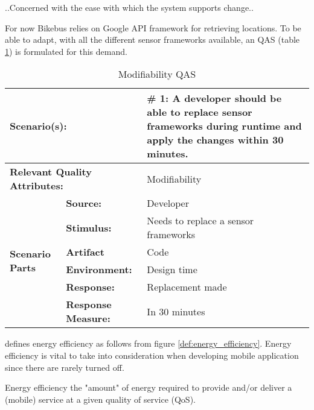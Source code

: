 \begin{defi}
..Concerned with the ease with which the system supports change..  
  \label{def:modifiability}
\end{defi}

 For now Bikebus relies on Google API framework for retrieving locations. To be able to adapt, with all the different sensor frameworks available, an QAS (table \ref{table:modifiability_qas}) is formulated for this demand. 

\begin{table}[H]
\begin{center}
\begin{tabular}{|p{0.3cm}|p{2.5cm}|p{8cm}|}
  \hline
  \multicolumn{2}{|p{3cm}|}{\bfseries Scenario(s):} & \#  1: A developer should be able to replace sensor frameworks during runtime and apply the changes within 30 minutes. \\
  \hline
  \multicolumn{2}{|p{3cm}|}{\bfseries Relevant Quality Attributes:} & Modifiability\\
  \hline
  \multirow{6}{*}{\begin{sideways}{\bfseries Scenario Parts}\end{sideways}}
  & {\bfseries Source:} & Developer \\
  \cline{2-3}
  & {\bfseries Stimulus:} & Needs to replace a sensor frameworks \\
  \cline{2-3}
  & {\bfseries Artifact} &  Code \\
  \cline{2-3}
  & {\bfseries Environment:} &  Design time \\
  \cline{2-3}
  & {\bfseries Response:} &  Replacement made\\
  \cline{2-3}
  & {\bfseries Response Measure:} & In 30 minutes\\
  \hline
\end{tabular}
\caption{Modifiability QAS}
\label{table:modifiability_qas}
\end{center}
  
\end{table}

\cite{Kjaergaard:2015:AQT:2737182.2737196} defines energy efficiency as follows from figure \ref{def:energy_efficiency}. Energy efficiency is vital to take into consideration when developing mobile application since there are rarely turned off.  

\begin{defi}
Energy efficiency the "amount" of energy required to provide and/or deliver a (mobile)
service at a given quality of service (QoS).  
  \label{def:energy_efficiency}
\end{defi}

